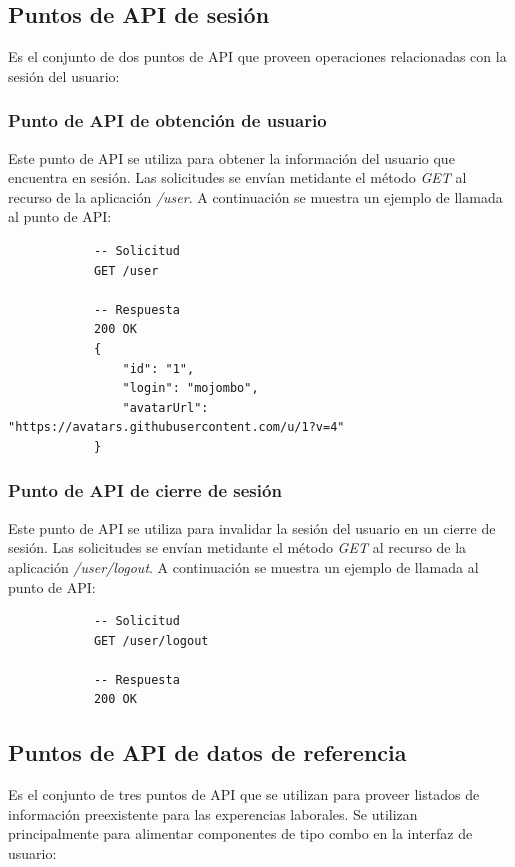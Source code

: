 \documentclass[a4paper, 12pt]{book}
\begin{document}
    \subsection{Puntos de API de sesión}
    \label{subsec:session_endpoints}
    Es el conjunto de dos puntos de API que proveen operaciones relacionadas con la sesión del usuario:

    \subsubsection{Punto de API de obtención de usuario}
    \label{subsec:get_user}
    Este punto de API se utiliza para obtener la información del usuario que encuentra en sesión.
    Las solicitudes se envían metidante el método \emph{GET} al recurso de la aplicación \emph{/user}.
    A continuación se muestra un ejemplo de llamada al punto de API:

        {\footnotesize
    \begin{verbatim}
			-- Solicitud
			GET /user

			-- Respuesta
			200 OK
			{
			    "id": "1",
			    "login": "mojombo",
			    "avatarUrl": "https://avatars.githubusercontent.com/u/1?v=4"
			}
    \end{verbatim}
    }

    \subsubsection{Punto de API de cierre de sesión}
    \label{subsec:get_user}
    Este punto de API se utiliza para invalidar la sesión del usuario en un cierre de sesión.
    Las solicitudes se envían metidante el método \emph{GET} al recurso de la aplicación \emph{/user/logout}.
    A continuación se muestra un ejemplo de llamada al punto de API:

        {\footnotesize
    \begin{verbatim}
			-- Solicitud
			GET /user/logout

			-- Respuesta
			200 OK
    \end{verbatim}
    }

    \subsection{Puntos de API de datos de referencia}
    \label{subsec:reference_endpoints}
    Es el conjunto de tres puntos de API que se utilizan para proveer listados de información preexistente para las experencias laborales.
    Se utilizan principalmente para alimentar componentes de tipo combo en la interfaz de usuario:
\end{document}
